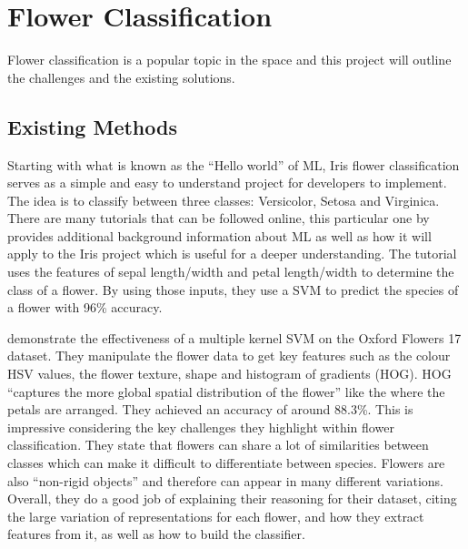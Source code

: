 \documentclass[12pt,a4paper]{report}
\begin{document}
\section{Flower Classification}

Flower classification is a popular topic in the space and this project will outline the challenges and the existing solutions.

\subsection{Existing Methods}

Starting with what is known as the “Hello world” of ML, Iris flower classification serves as a simple and easy to 
understand project for developers to implement. The idea is to classify between three classes: Versicolor, Setosa and 
Virginica. There are many tutorials that can be followed online, this particular one by \citet{DataFlairND}
provides additional background information about ML as well as how it will apply to the Iris project which is useful for
a deeper understanding. The tutorial uses the features of sepal length/width and petal length/width to determine the class of
a flower. By using those inputs, they use a SVM to predict the species of a flower with 96\% accuracy.

\par

\citet{Nilsback2008} demonstrate the effectiveness of a multiple kernel SVM on the Oxford Flowers 17 dataset. 
They manipulate the flower data to get key features such as the colour HSV values, the flower texture, shape and 
histogram of gradients (HOG). HOG “captures the more global spatial distribution of the flower” like the where the 
petals are arranged. They achieved an accuracy of around 88.3\%. This is impressive considering the key challenges they 
highlight within flower classification. They state that flowers can share a lot of similarities between classes which 
can make it difficult to differentiate between species. Flowers are also “non-rigid objects” and therefore can appear in
many different variations. Overall, they do a good job of explaining their reasoning for their dataset, citing the 
large variation of representations for each flower, and how they extract features from it, as well as how to build the
classifier.

\par
\end{document}
